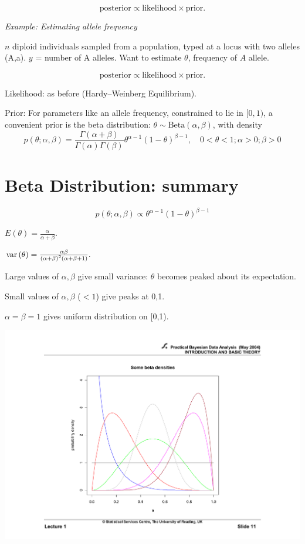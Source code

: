 $$\mbox{posterior} \propto \mbox{likelihood} \times \mbox{prior}.$$
 \es\bs

{\em Example: Estimating allele frequency} 

 $n$ diploid individuals sampled from a population, typed
at a locus with two alleles (A,a). $y$ = number of A alleles. Want
to estimate $\theta$, frequency of $A$ allele.

$$\mbox{posterior} \propto \mbox{likelihood} \times \mbox{prior}.$$

Likelihood: as before (Hardy--Weinberg Equilibrium).

Prior: For parameters like an allele frequency, constrained to lie in $[0,1)$, a convenient prior is
the beta distribution: $\theta \sim \mbox{Beta}\left( {\alpha ,\beta }\right)$, with density
$$p\left( \theta ; \alpha, \beta \right) = \frac{{\Gamma
\left( {\alpha  + \beta } \right)}}{{\Gamma \left( \alpha  \right)\Gamma
\left( \beta  \right)}}\theta ^{\alpha  - 1} \left( {1 - \theta }
\right)^{\beta  - 1} ,\quad  0 < \theta  < 1; \alpha>0; \beta>0$$

\section*{Beta Distribution: summary}

$$p(\theta; \alpha, \beta) \propto \theta^{\alpha-1} (1-\theta)^{\beta-1}$$

 $E\left( \theta \right) = \frac{\alpha }{{\alpha  + \beta }}.$

 ${\mathop{\rm var}} \left( \theta  \right) = \frac{{\alpha \beta }}{{\left( {\alpha  + \beta } \right)^2 \left( {\alpha  + \beta  + 1} \right)}}.$

Large values of $\alpha,\beta$ give small variance: $\theta$ becomes peaked about its expectation.

Small values of $\alpha, \beta$ ($<1$) give peaks at 0,1.

$\alpha=\beta=1$ gives uniform distribution on [0,1).

\es\bs
	\begin{center}
		\includegraphics[width=.7\textwidth]{figures/betaplot}
	\end{center}
    \es\bs

